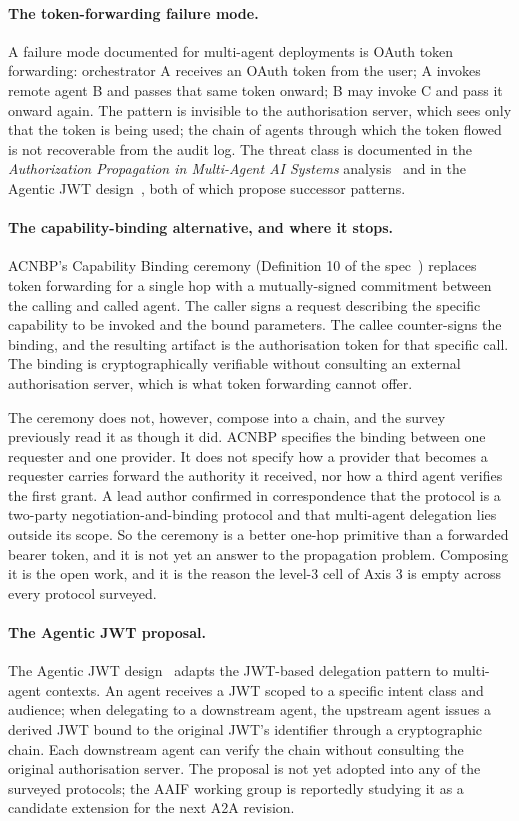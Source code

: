 \paragraph{The token-forwarding failure mode.}
A failure mode documented for multi-agent deployments is
OAuth token forwarding: orchestrator A
receives an OAuth token from the user; A invokes remote
agent B and passes that same token onward; B may invoke C
and pass it onward again. The pattern is invisible to the
authorisation server, which sees only that the token is
being used; the chain of agents through which the token
flowed is not recoverable from the audit log. The threat
class is documented in the \emph{Authorization Propagation
in Multi-Agent AI Systems} analysis~\cite{authz_propagation}
and in the Agentic JWT design~\cite{agentic_jwt}, both of
which propose successor patterns.

\paragraph{The capability-binding alternative, and where it
stops.}
ACNBP's Capability Binding ceremony (Definition 10 of the
spec~\cite{spec_acnbp}) replaces token forwarding for a
single hop with a mutually-signed commitment between the
calling and called agent. The caller signs a request
describing the specific capability to be invoked and the
bound parameters. The callee counter-signs the binding, and
the resulting artifact is the authorisation token for that
specific call. The binding is cryptographically verifiable
without consulting an external authorisation server, which
is what token forwarding cannot offer.

The ceremony does not, however, compose into a chain, and
the survey previously read it as though it did. ACNBP
specifies the binding between one requester and one
provider. It does not specify how a provider that becomes
a requester carries forward the authority it received, nor
how a third agent verifies the first grant. A lead author
confirmed in correspondence that the protocol is a
two-party negotiation-and-binding protocol and that
multi-agent delegation lies outside its scope. So the
ceremony is a better one-hop primitive than a forwarded
bearer token, and it is not yet an answer to the
propagation problem. Composing it is the open work, and it
is the reason the level-3 cell of Axis 3 is empty across
every protocol surveyed.

\paragraph{The Agentic JWT proposal.}
The Agentic JWT design~\cite{agentic_jwt} adapts the
JWT-based delegation pattern to multi-agent contexts. An
agent receives a JWT scoped to a specific intent class and
audience; when delegating to a downstream agent, the
upstream agent issues a derived JWT bound to the original
JWT's identifier through a cryptographic chain. Each
downstream agent can verify the chain without consulting the
original authorisation server. The proposal is not yet
adopted into any of the surveyed protocols; the AAIF
working group is reportedly studying it as a candidate
extension for the next A2A revision.

